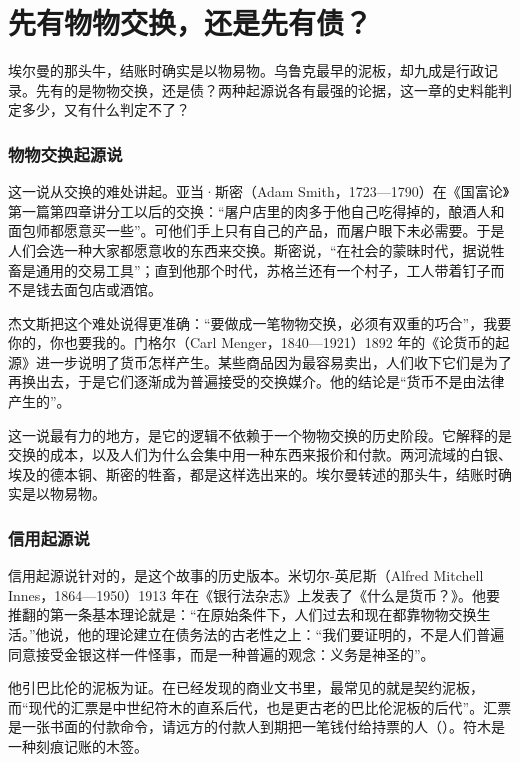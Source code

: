 \section{先有物物交换，还是先有债？}\label{sec:meso-debate}

埃尔曼的那头牛，结账时确实是以物易物。乌鲁克最早的泥板，却九成是行政记录。先有的是物物交换，还是债？两种起源说各有最强的论据，这一章的史料能判定多少，又有什么判定不了？

\subsubsection{物物交换起源说}
这一说从交换的难处讲起。亚当·斯密（Adam Smith，1723—1790）在《国富论》第一篇第四章讲分工以后的交换：“屠户店里的肉多于他自己吃得掉的，酿酒人和面包师都愿意买一些”。可他们手上只有自己的产品，而屠户眼下未必需要\cite{smith1776}。于是人们会选一种大家都愿意收的东西来交换。斯密说，“在社会的蒙昧时代，据说牲畜是通用的交易工具”；直到他那个时代，苏格兰还有一个村子，工人带着钉子而不是钱去面包店或酒馆\cite{smith1776}。

杰文斯把这个难处说得更准确：“要做成一笔物物交换，必须有双重的巧合”，我要你的，你也要我的\cite{jevons1875}。门格尔（Carl Menger，1840—1921）1892 年的《论货币的起源》进一步说明了货币怎样产生。某些商品因为最容易卖出，人们收下它们是为了再换出去，于是它们逐渐成为普遍接受的交换媒介。他的结论是“货币不是由法律产生的”\cite{menger1892}。

这一说最有力的地方，是它的逻辑不依赖于一个物物交换的历史阶段。它解释的是交换的成本，以及人们为什么会集中用一种东西来报价和付款。两河流域的白银、埃及的德本铜、斯密的牲畜，都是这样选出来的。埃尔曼转述的那头牛，结账时确实是以物易物。

\subsubsection{信用起源说}
信用起源说针对的，是这个故事的历史版本。米切尔-英尼斯（Alfred Mitchell Innes，1864—1950）1913 年在《银行法杂志》上发表了《什么是货币？》。他要推翻的第一条基本理论就是：“在原始条件下，人们过去和现在都靠物物交换生活。”\cite{innes1913}他说，他的理论建立在债务法的古老性之上：“我们要证明的，不是人们普遍同意接受金银这样一件怪事，而是一种普遍的观念：义务是神圣的”\cite{innes1913}。

他引巴比伦的泥板为证。在已经发现的商业文书里，最常见的就是契约泥板，而“现代的汇票是中世纪符木的直系后代，也是更古老的巴比伦泥板的后代”\cite{innes1913}。汇票是一张书面的付款命令，请远方的付款人到期把一笔钱付给持票的人（）。符木是一种刻痕记账的木签。

